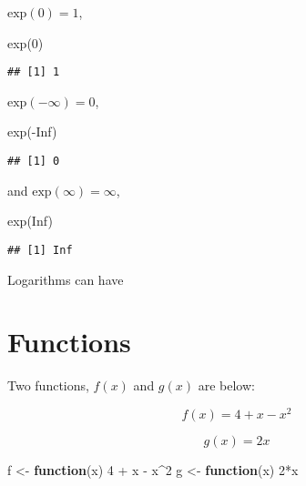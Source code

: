 \documentclass[
]{book}
\newenvironment{Shaded}{\begin{snugshade}}{\end{snugshade}}
\newcommand{\ConstantTok}[1]{\textcolor[rgb]{0.00,0.00,0.00}{#1}}
\newcommand{\ControlFlowTok}[1]{\textcolor[rgb]{0.13,0.29,0.53}{\textbf{#1}}}
\newcommand{\DecValTok}[1]{\textcolor[rgb]{0.00,0.00,0.81}{#1}}
\newcommand{\FunctionTok}[1]{\textcolor[rgb]{0.00,0.00,0.00}{#1}}
\newcommand{\NormalTok}[1]{#1}
\newcommand{\OtherTok}[1]{\textcolor[rgb]{0.56,0.35,0.01}{#1}}
\newcommand{\SpecialCharTok}[1]{\textcolor[rgb]{0.00,0.00,0.00}{#1}}
\begin{document}
\(\text{exp}(0) = 1\),

\begin{Shaded}
\begin{Highlighting}[]
\FunctionTok{exp}\NormalTok{(}\DecValTok{0}\NormalTok{)}
\end{Highlighting}
\end{Shaded}

\begin{verbatim}
## [1] 1
\end{verbatim}

\(\text{exp}(-\infty) = 0\),

\begin{Shaded}
\begin{Highlighting}[]
\FunctionTok{exp}\NormalTok{(}\SpecialCharTok{{-}}\ConstantTok{Inf}\NormalTok{)}
\end{Highlighting}
\end{Shaded}

\begin{verbatim}
## [1] 0
\end{verbatim}

and \(\text{exp}(\infty) = \infty\),

\begin{Shaded}
\begin{Highlighting}[]
\FunctionTok{exp}\NormalTok{(}\ConstantTok{Inf}\NormalTok{)}
\end{Highlighting}
\end{Shaded}

\begin{verbatim}
## [1] Inf
\end{verbatim}

Logarithms can have

\hypertarget{functions}{%
\chapter{Functions}\label{functions}}

Two functions, \(f(x)\) and \(g(x)\) are below:

\[
f(x) = 4 + x - x^2 \label{eq:f} 
\]

\[
g(x) = 2x \label{eq:g}
\]

\begin{Shaded}
\begin{Highlighting}[]
\NormalTok{f }\OtherTok{\textless{}{-}} \ControlFlowTok{function}\NormalTok{(x) }\DecValTok{4} \SpecialCharTok{+}\NormalTok{ x }\SpecialCharTok{{-}}\NormalTok{ x}\SpecialCharTok{\^{}}\DecValTok{2}
\NormalTok{g }\OtherTok{\textless{}{-}} \ControlFlowTok{function}\NormalTok{(x) }\DecValTok{2}\SpecialCharTok{*}\NormalTok{x}
\end{Highlighting}
\end{Shaded}
\end{document}
